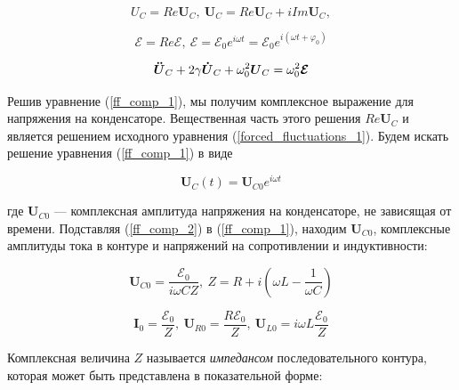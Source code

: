 \documentclass[a4paper, 12pt]{article}
\begin{document}
    \begin{equation}
        U_C = Re \boldsymbol{U}_C, \: \boldsymbol{U}_C = Re \boldsymbol{U}_C + i Im \boldsymbol{U}_C,
    \end{equation}

    \begin{equation}
        \mathcal{E} = Re \boldsymbol{\mathcal{E}}, \: \boldsymbol{\mathcal{E}} = \boldsymbol{\mathcal{E}}_0 e^{i \omega t} = \mathcal{E}_0 e^{i(\omega t + \varphi_0)}
    \end{equation}
        
    \begin{equation}
        \boldsymbol{\Ddot{U}}_C + 2 \gamma \boldsymbol{\Dot{U}}_C + \omega_0^2 \boldsymbol{U}_C = \omega_0^2 \boldsymbol{\mathcal{E}}
        \label{ff_comp_1}
    \end{equation}

    Решив уравнение (\ref{ff_comp_1}), мы получим комплексное выражение для напряжения на конденсаторе. Вещественная часть этого решения $Re \boldsymbol{U}_C$ и является решением исходного уравнения (\ref{forced_fluctuations_1}). Будем искать решение уравнения (\ref{ff_comp_1}) в виде

    \begin{equation}
        \boldsymbol{U}_C (t) = \boldsymbol{U}_{C0} e^{i \omega t}
        \label{ff_comp_2}
    \end{equation}

    где $\boldsymbol{U}_{C0}$ — комплексная амплитуда напряжения на конденсаторе, не зависящая от времени. Подставляя (\ref{ff_comp_2}) в (\ref{ff_comp_1}), находим $\boldsymbol{U}_{C0}$, комплексные амплитуды тока в контуре и напряжений на сопротивлении и индуктивности:

    \begin{equation}
        \boldsymbol{U}_{C0} = \frac{\boldsymbol{\mathcal{E}}_0}{i \omega C Z}, \: Z = R + i \left( \omega L - \frac{1}{\omega C} \right)
    \end{equation}

    \begin{equation}
        \boldsymbol{I}_0 = \frac{\boldsymbol{\mathcal{E}}_0}{Z}, \: \boldsymbol{U}_{R0} = \frac{R \boldsymbol{\mathcal{E}}_0}{Z}, \: \boldsymbol{U}_{L0} = i\omega L \frac{\boldsymbol{\mathcal{E}}_0}{Z}
    \end{equation}

    Комплексная величина $Z$ называется \textit{импедансом} последовательного контура, которая может быть представлена в показательной форме:
\end{document}
